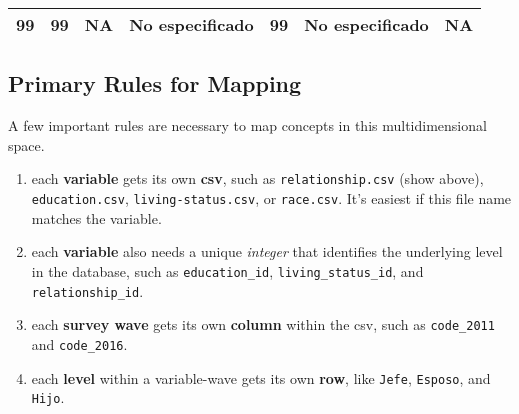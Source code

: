 \documentclass[
]{book}
\begin{document}
\begin{longtable}[]{@{}lllllll@{}}
\begin{minipage}[t]{0.10\columnwidth}
99\strut
\end{minipage} & \begin{minipage}[t]{0.07\columnwidth}\raggedright
99\strut
\end{minipage} & \begin{minipage}[t]{0.07\columnwidth}\raggedright
NA\strut
\end{minipage} & \begin{minipage}[t]{0.16\columnwidth}\raggedright
No especificado\strut
\end{minipage} & \begin{minipage}[t]{0.09\columnwidth}\raggedright
99\strut
\end{minipage} & \begin{minipage}[t]{0.16\columnwidth}\raggedright
No especificado\strut
\end{minipage} & \begin{minipage}[t]{0.16\columnwidth}\raggedright
NA\strut
\end{minipage}\tabularnewline
\bottomrule
\end{longtable}

\hypertarget{primary-rules-for-mapping}{%
\subsection{Primary Rules for Mapping}\label{primary-rules-for-mapping}}

A few important rules are necessary to map concepts in this multidimensional space.

\begin{enumerate}
\def\labelenumi{\arabic{enumi}.}
\item
  each \textbf{variable} gets its own \textbf{csv}, such as \texttt{relationship.csv} (show above), \texttt{education.csv}, \texttt{living-status.csv}, or \texttt{race.csv}. It's easiest if this file name matches the variable.
\item
  each \textbf{variable} also needs a unique \emph{integer} that identifies the underlying level in the database, such as \texttt{education\_id}, \texttt{living\_status\_id}, and \texttt{relationship\_id}.
\item
  each \textbf{survey wave} gets its own \textbf{column} within the csv, such as \texttt{code\_2011} and \texttt{code\_2016}.
\item
  each \textbf{level} within a variable-wave gets its own \textbf{row}, like \texttt{Jefe}, \texttt{Esposo}, and \texttt{Hijo}.
\end{enumerate}
\end{document}
